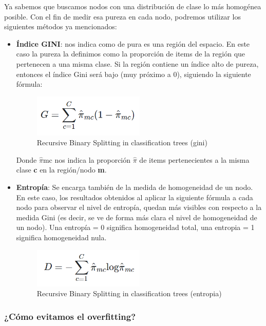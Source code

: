 Ya sabemos que buscamos nodos con una distribución de clase lo más homogénea posible. Con el fin de medir esa pureza en cada nodo, podremos utilizar los siguientes métodos ya mencionados:
\begin{itemize}
	\item \textbf{Índice GINI}: nos indica como de pura es una región del espacio. En este caso la pureza la definimos como la proporción de items de la región que pertenecen a una misma clase. Si la región contiene un índice
	alto de pureza, entonces el índice Gini será bajo (muy próximo a 0), siguiendo la siguiente fórmula:
	\begin{figure}[H]
		\centering
		\includegraphics[width=0.5\textwidth]{imagenes/gini} 
		\caption{Recursive Binary Splitting in classification trees (gini) \cite{ref8}}
	\end{figure}
	Donde $\widehat{\pi}$mc nos indica la proporción \textbf{$\widehat{\pi}$} de items pertenecientes a la misma clase \textbf{c} en la región/nodo \textbf{m}.
	\item \textbf{Entropía}: Se encarga también de la medida de homogeneidad de un nodo. En este caso, los resultados obtenidos al aplicar la siguiente fórmula a cada nodo para observar el nivel de entropía, quedan más visibles con respecto a la medida Gini (es decir, se ve de forma más clara el nivel de homogeneidad de un nodo). Una entropía = 0 significa homogeneidad total, una entropia = 1 significa homogeneidad nula.
	\begin{figure}[H]
		\centering
		\includegraphics[width=0.5\textwidth]{imagenes/entropia} 
		\caption{Recursive Binary Splitting in classification trees (entropia) \cite{ref8}}
	\end{figure}
\end{itemize}

\subsubsection{¿Cómo evitamos el overfitting?}

